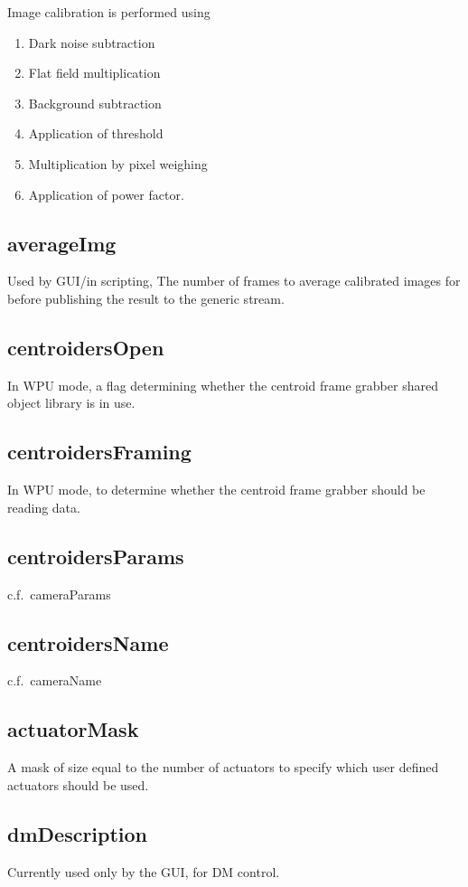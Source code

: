 \documentclass[a4,10pt]{article}
\begin{document}
Image calibration is performed using
\begin{enumerate}
\item Dark noise subtraction
\item Flat field multiplication
\item Background subtraction
\item Application of threshold
\item Multiplication by pixel weighing
\item Application of power factor.
\end{enumerate}

\subsection{averageImg}
Used by GUI/in scripting, The number of frames to average calibrated
images for before publishing the result to the generic stream.

\subsection{centroidersOpen}
In WPU mode, a flag determining whether the centroid frame grabber
shared object library is in use.

\subsection{centroidersFraming}
In WPU mode, to determine whether the centroid frame grabber should be
reading data.

\subsection{centroidersParams}
c.f.\ cameraParams

\subsection{centroidersName}
c.f.\ cameraName

\subsection{actuatorMask}
A mask of size equal to the number of actuators to specify which user
defined actuators should be used.

\subsection{dmDescription}
Currently used only by the GUI, for DM control.
\end{document}
